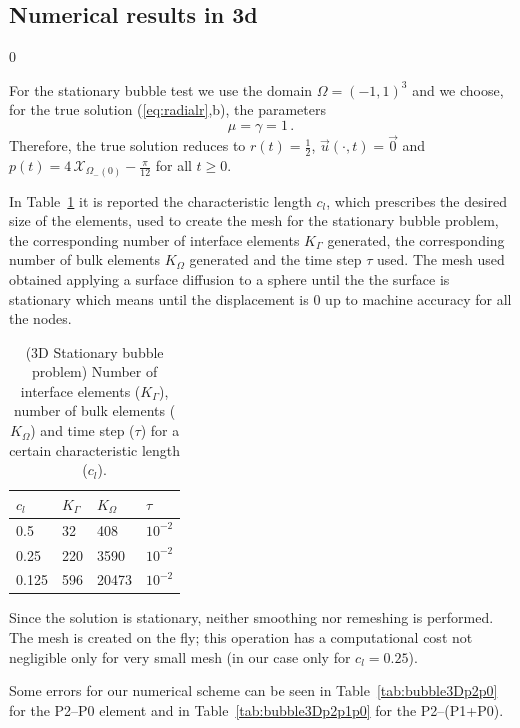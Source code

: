 \documentclass[a4paper,12pt,onecolumn]{article}
\newcommand{\bigchi}{\ensuremath{\mathrm{\mathcal{X}}}}
\newcommand{\charfcn}[1]{\bigchi_{#1}} %
\begin{document}
\subsection{Numerical results in 3d} \label{subsec:numerical_results_3d}
\setcounter{equation} 0

For the stationary bubble test we use the domain $\Omega = (-1,1)^3$ and we choose, for the true solution (\ref{eq:radialr},b), the parameters
\begin{equation*}
\mu = \gamma = 1\,. 
\end{equation*}
Therefore, the true solution reduces to $r(t) = \frac{1}{2}$, $\vec u(\cdot, t) = \vec 0$ and $p(t) = 4\,\charfcn{\Omega_-(0)} - \frac{\pi}{12}$ for all $t\geq0$.

In Table~\ref{tab:bubble3Delements} it is reported the characteristic length $c_l$, which prescribes the desired size of the elements, used to create the mesh for the stationary bubble problem, the corresponding number of interface elements $K_\Gamma$ generated, the corresponding number of bulk elements $K_\Omega$ generated and the time step $\tau$ used. The mesh used obtained applying a surface diffusion to a sphere until the the surface is stationary which means until the displacement is 0 up to machine accuracy for all the nodes.
\begin{table}
 \center
 \hspace*{-2cm}
\begin{tabular}{llll}
\hline
$c_l$ & $K_\Gamma$ & $K_\Omega$ & $\tau$ \\
\hline
0.5 & 32 & 408 & $10^{-2}$ \\
0.25 & 220 & 3590 & $10^{-2}$\\
0.125 & 596 & 20473 & $10^{-2}$\\
\hline
\end{tabular}
\hspace*{-2cm}
\caption{(3D Stationary bubble problem) Number of interface elements ($K_\Gamma$), number of bulk elements ($K_\Omega$) and time step ($\tau$) for a certain characteristic length ($c_l$).}
\label{tab:bubble3Delements}
\end{table}

Since the solution is stationary, neither smoothing nor remeshing is performed. The mesh is created on the fly; this operation has a computational cost not negligible only for very small mesh (in our case only for $c_l=0.25$). 

Some errors for our numerical scheme can be seen in Table~\ref{tab:bubble3Dp2p0} for the P2--P0 element and in Table~\ref{tab:bubble3Dp2p1p0} for the P2--(P1+P0). 
\end{document}
